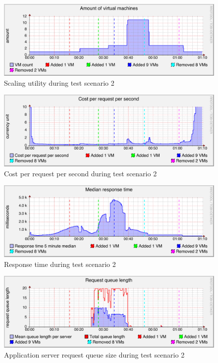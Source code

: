 \documentclass[english]{tktltiki2}
\theoremstyle{definition}
\theoremstyle{remark}
\begin{document}
\begin{figure}[htbp]
	\includegraphics[width=\textwidth]{images/vmcountgraph-test23}
	\caption{Scaling utility during test scenario 2}
	\label{fig:vmCountScenario2}
\end{figure}

\begin{figure}[htbp]
	\includegraphics[width=\textwidth]{images/costperrequestpersecondgraph-test23}
	\caption{Cost per request per second during test scenario 2}
	\label{fig:costScenario2}
\end{figure}

\begin{figure}[htbp]
	\includegraphics[width=\textwidth]{images/responsetimegraph-test23}
	\caption{Response time during test scenario 2}
	\label{fig:responseTimeScenario2}
\end{figure}

\begin{figure}[htbp]
	\includegraphics[width=\textwidth]{images/queuesizegraph-test23}
	\caption{Application server request queue size during test scenario 2}
	\label{fig:queueScenario2}
\end{figure}
\end{document}
